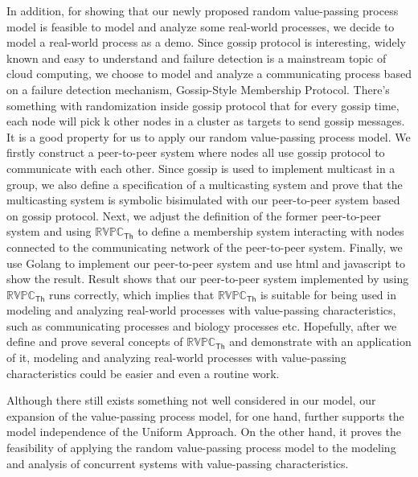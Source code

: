 \begin{digest}
   In addition, for showing that our newly proposed random value-passing process model is feasible to model and analyze some real-world processes, we decide to model a real-world process as a demo. Since gossip protocol is interesting, widely known and easy to understand and failure detection is a mainstream topic of cloud computing, we choose to model and analyze a communicating process based on a failure detection mechanism, Gossip-Style Membership Protocol. There's something with randomization inside gossip protocol that for every gossip time, each node will pick k other nodes in a cluster as targets to send gossip messages. It is a good property for us to apply our random value-passing process model. We firstly construct a peer-to-peer system where nodes all use gossip protocol to communicate with each other. Since gossip is used to implement multicast in a group, we also define a specification of a multicasting system and prove that the multicasting system is symbolic bisimulated with our peer-to-peer system based on gossip protocol. Next, we adjust the definition of the former peer-to-peer system and using $\mathbb{RVPC}_{\mathsf{Th}}$ to define a membership system interacting with nodes connected to the communicating network of the peer-to-peer system. Finally, we use Golang to implement our peer-to-peer system and use html and javascript to show the result. Result shows that our peer-to-peer system implemented by using $\mathbb{RVPC}_{\mathsf{Th}}$ runs correctly, which implies that $\mathbb{RVPC}_{\mathsf{Th}}$ is suitable for being used in modeling and analyzing real-world processes with value-passing characteristics, such as communicating processes and biology processes etc. Hopefully, after we define and prove several concepts of $\mathbb{RVPC}_{\mathsf{Th}}$ and demonstrate with an application of it, modeling and analyzing real-world processes with value-passing characteristics could be easier and even a routine work.

  Although there still exists something not well considered in our model, our expansion of the value-passing process model, for one hand, further supports the model independence of the Uniform Approach. On the other hand, it proves the feasibility of applying the random value-passing process model to the modeling and analysis of concurrent systems with value-passing characteristics.

\end{digest}
